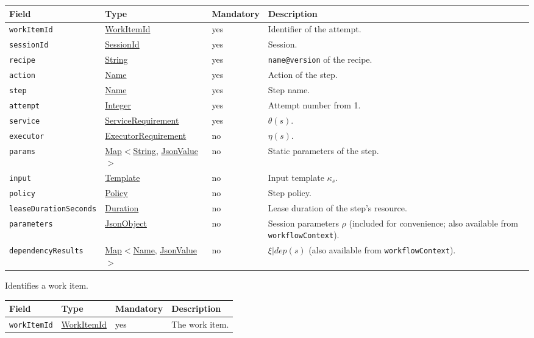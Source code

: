 \documentclass[a4paper]{arrowhead}
\newcommand{\mref}[1]{{\textcolor{ArrowheadPurple}{\hyperref[sec:model:#1]{#1}}}}
\newcommand{\pref}[1]{{\textcolor{ArrowheadGrey}{\hyperref[sec:model:primitives:#1]{#1}}}}
\begin{document}
{\small
\begin{longtable}{|p{3.7cm}|p{4.2cm}|p{1.6cm}|p{6.3cm}|}

\hline
\rowcolor{gray!33} Field & Type & Mandatory & Description \\ \hline
\endhead
\texttt{workItemId} & \pref{WorkItemId} & yes & Identifier of the attempt. \\ \hline
\texttt{sessionId} & \pref{SessionId} & yes & Session. \\ \hline
\texttt{recipe} & \pref{String} & yes & \texttt{name@version} of the recipe. \\ \hline
\texttt{action} & \pref{Name} & yes & Action of the step. \\ \hline
\texttt{step} & \pref{Name} & yes & Step name. \\ \hline
\texttt{attempt} & \pref{Integer} & yes & Attempt number from 1. \\ \hline
\texttt{service} & \mref{ServiceRequirement} & yes & $\theta(s)$. \\ \hline
\texttt{executor} & \mref{ExecutorRequirement} & no & $\eta(s)$. \\ \hline
\texttt{params} & \pref{Map}$<$\pref{String}, \pref{JsonValue}$>$ & no & Static parameters of the step. \\ \hline
\texttt{input} & \pref{Template} & no & Input template $\kappa_s$. \\ \hline
\texttt{policy} & \mref{Policy} & no & Step policy. \\ \hline
\texttt{leaseDurationSeconds} & \pref{Duration} & no & Lease duration of the step's resource. \\ \hline
\texttt{parameters} & \pref{JsonObject} & no & Session parameters $\rho$ (included for convenience; also available from \texttt{workflowContext}). \\ \hline
\texttt{dependencyResults} & \pref{Map}$<$\pref{Name}, \pref{JsonValue}$>$ & no & $\xi|dep(s)$ (also available from \texttt{workflowContext}). \\ \hline
\end{longtable}
}

Identifies a work item.

{\small
\begin{longtable}{|p{3.7cm}|p{4.2cm}|p{1.6cm}|p{6.3cm}|}

\hline
\rowcolor{gray!33} Field & Type & Mandatory & Description \\ \hline
\endhead
\texttt{workItemId} & \pref{WorkItemId} & yes & The work item. \\ \hline
\end{longtable}
}
\end{document}
